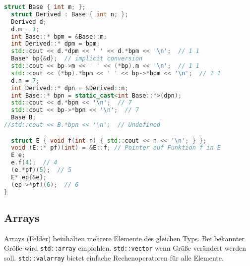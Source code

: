 \begin{lstlisting}[language=C++]
  struct Base { int m; };
  struct Derived : Base { int n; };
  Derived d;
  d.m = 1;
  int Base::* bpm = &Base::m;
  int Derived::* dpm = bpm;
  std::cout << d.*dpm << ' ' << d.*bpm << '\n';  // 1 1
  Base* bp{&d};  // implicit conversion
  std::cout << bp->m << ' ' << (*bp).m << '\n';  // 1 1
  std::cout << (*bp).*bpm << ' ' << bp->*bpm << '\n';  // 1 1
  d.n = 7;
  int Derived::* dpn = &Derived::n;
  int Base::* bpn = static_cast<int Base::*>(dpn);
  std::cout << d.*bpn << '\n';  // 7
  std::cout << bp->*bpn << '\n';  // 7
  Base B;
//std::cout << B.*bpn << '\n';  // Undefined

  struct E { void f(int n) { std::cout << n << '\n'; } };
  void (E::* pf)(int) = &E::f; // Pointer auf Funktion f in E
  E e;
  e.f(4);  // 4
  (e.*pf)(5);  // 5
  E* ep{&e};
  (ep->*pf)(6);  // 6
}
\end{lstlisting}

\subsection{Arrays}

Arrays (Felder) beinhalten mehrere Elemente des gleichen Typs. Bei bekannter
Größe wird \lstinline|std::array| empfohlen. \lstinline|std::vector| wenn Größe
verändert werden soll. \lstinline|std::valarray| bietet einfache
Rechenoperatoren für alle Elemente.

